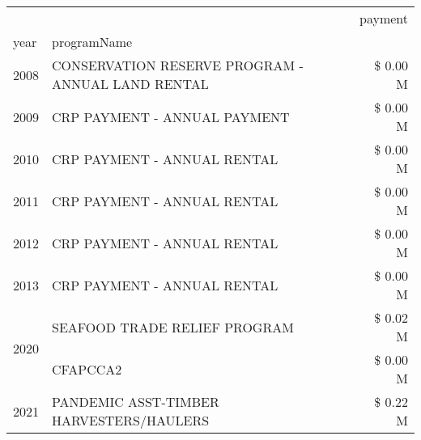 \begin{tabular}{llr}
\toprule
 &  & payment \\
year & programName &  \\
\midrule
2008 & CONSERVATION RESERVE PROGRAM - ANNUAL LAND RENTAL & \$ 0.00 M \\
\cline{1-3}
2009 & CRP PAYMENT - ANNUAL PAYMENT & \$ 0.00 M \\
\cline{1-3}
2010 & CRP PAYMENT - ANNUAL RENTAL & \$ 0.00 M \\
\cline{1-3}
2011 & CRP PAYMENT - ANNUAL RENTAL & \$ 0.00 M \\
\cline{1-3}
2012 & CRP PAYMENT - ANNUAL RENTAL & \$ 0.00 M \\
\cline{1-3}
2013 & CRP PAYMENT - ANNUAL RENTAL & \$ 0.00 M \\
\cline{1-3}
\multirow[t]{2}{*}{2020} & SEAFOOD TRADE RELIEF PROGRAM & \$ 0.02 M \\
 & CFAPCCA2 & \$ 0.00 M \\
\cline{1-3}
2021 & PANDEMIC ASST-TIMBER HARVESTERS/HAULERS & \$ 0.22 M \\
\cline{1-3}
\bottomrule
\end{tabular}
